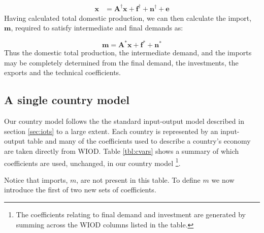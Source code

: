 \documentclass[a4paper]{article}
\begin{document}
\begin{align}
\boldsymbol{x}& = 
\boldsymbol{A^\dagger}\boldsymbol{x}
+ 
\boldsymbol{f^\dagger} + \boldsymbol{n^\dagger} + \boldsymbol{e} 
\label{eqn:xIRIO}
\end{align}
Having calculated total domestic production, we can then calculate the import, $\boldsymbol{m}$, required to satisfy intermediate and final demands as:

\begin{equation}\label{eqn:mIRIO}
\boldsymbol{m}
=
\boldsymbol{A^*}\boldsymbol{x}
+
\boldsymbol{f^*} + \boldsymbol{n^*} 
\end{equation}
Thus the domestic total production, the intermediate demand, and the imports may be completely determined from the final demand, the investments, the exports and the technical coefficients.

\subsection{A single country model}\label{sec:countries}
Our country model follows the the standard input-output model described in section \ref{sec:iots} to a large extent.
Each country is represented by an input-output table and many of the coefficients used to describe a country's economy are taken directly from WIOD.
Table \ref{tbl:cvars} shows a summary of which coefficients are used, unchanged, in our country model \footnote{The coefficients relating to final demand and investment are generated by summing across the WIOD columns listed in the table.}.

Notice that imports, $m$, are not present in this table.
To define $m$ we now introduce the first of two new sets of coefficients. 
\end{document}
